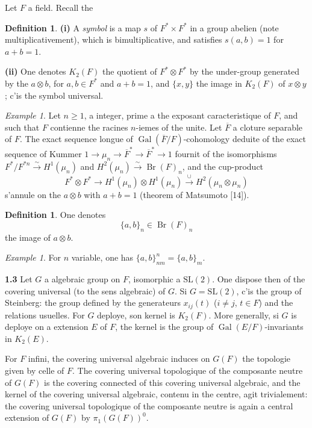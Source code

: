 \documentclass[12pt,a4paper]{article}
\theoremstyle{plain}
\theoremstyle{definition}
\newtheorem{definition}[theorem]{Definition}
\theoremstyle{remark}
\newtheorem{example}[theorem]{Example}
\DeclareMathOperator{\Br}{Br}
\newcommand{\ov}[1]{\overline{#1}}
\DeclareMathOperator{\Gal}{Gal}
\providecommand{\Gal}{\operatorname{Gal}}
\begin{document}
Let $F$ a field. Recall the

\begin{definition}
\textbf{(i)} A \emph{symbol} is a map $s$ of $F^* \times F^*$ in a group abelien (note multiplicativement), which is bimultiplicative, and satisfies $s(a, b) = 1$ for $a + b = 1$.

\textbf{(ii)} One denotes $K_2(F)$ the quotient of $F^* \otimes F^*$ by the under-group generated by the $a \otimes b$, for $a, b \in F^*$ and $a + b = 1$, and $\{x, y\}$ the image in $K_2(F)$ of $x \otimes y$; c'is the symbol universal.
\end{definition}

\begin{example}
Let $n \geq 1$, a integer, prime a the exposant caracteristique of $F$, and such that $F$ contienne the racines $n$-iemes of the unite. Let $\ov{F}$ a cloture separable of $F$. The exact sequence longue of $\Gal(\ov{F}/F)$-cohomology deduite of the exact sequence of Kummer $1 \to \mu_n \to \ov{F}^* \to \ov{F}^* \to 1$ fournit of the isomorphisms $F^*/F^{*n} \xrightarrow{\sim} H^1(\mu_n)$ and $H^2(\mu_n) \xrightarrow{\sim} \Br(F)_n$, and the cup-product
\[
F^* \otimes F^* \longrightarrow H^1(\mu_n) \otimes H^1(\mu_n) \xrightarrow{\ \cup\ } H^2(\mu_n \otimes \mu_n)
\]
s'annule on the $a \otimes b$ with $a + b = 1$ (theorem of Matsumoto [14]).
\end{example}

\begin{definition}
One denotes
\[
\{a, b\}_n \in \Br(F)_n
\]
the image of $a \otimes b$.
\end{definition}

\begin{example}
For $n$ variable, one has $\{a, b\}_{nm}^n = \{a, b\}_m$.
\end{example}

\textbf{1.3} Let $G$ a algebraic group on $F$, isomorphic a $\mathrm{SL}(2)$. One dispose then of the covering universal (to the sens algebraic) of $G$. Si $G = \mathrm{SL}(2)$, c'is the group of Steinberg: the group defined by the generateurs $x_{ij}(t)$ ($i \neq j$, $t \in F$) and the relations usuelles. For $G$ deploye, son kernel is $K_2(F)$. More generally, si $G$ is deploye on a extension $E$ of $F$, the kernel is the group of $\Gal(E/F)$-invariants in $K_2(E)$.

For $F$ infini, the covering universal algebraic induces on $G(F)$ the topologie given by celle of $F$. The covering universal topologique of the composante neutre of $G(F)$ is the covering connected of this covering universal algebraic, and the kernel of the covering universal algebraic, contenu in the centre, agit trivialement: the covering universal topologique of the composante neutre is again a central extension of $G(F)$ by $\pi_1(G(F))^0$.
\end{document}
